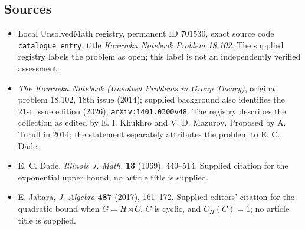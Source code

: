\documentclass[11pt]{article}
\begin{document}
\subsection{Sources}
\begin{itemize}
\item Local UnsolvedMath registry, permanent ID \(701530\), exact source code \texttt{catalogue entry}, title \emph{Kourovka Notebook Problem 18.102}. The supplied registry labels the problem as open; this label is not an independently verified assessment.
\item \emph{The Kourovka Notebook (Unsolved Problems in Group Theory)}, original problem 18.102, 18th issue (2014); supplied background also identifies the 21st issue edition (2026), \texttt{arXiv:1401.0300v48}. The registry describes the collection as edited by E. I. Khukhro and V. D. Mazurov. Proposed by A. Turull in 2014; the statement separately attributes the problem to E. C. Dade.
\item E. C. Dade, \emph{Illinois J. Math.} \textbf{13} (1969), 449--514. Supplied citation for the exponential upper bound; no article title is supplied.
\item E. Jabara, \emph{J. Algebra} \textbf{487} (2017), 161--172. Supplied editors' citation for the quadratic bound when \(G=H\rtimes C\), \(C\) is cyclic, and \(C_H(C)=1\); no article title is supplied.
\end{itemize}
\end{document}
